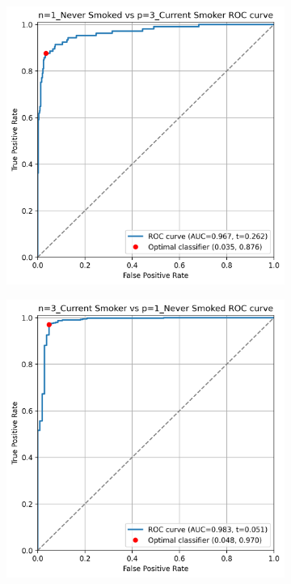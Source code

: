 \documentclass{article} %
\begin{document}
\begin{figure}[p]
    \centering
    \begin{subfigure}{0.46\linewidth}
        \centering
        \includegraphics[width=\linewidth]{cohort2/test_1v3_roc.png}
    \end{subfigure}
    \hspace{4mm}
    \begin{subfigure}{0.46\linewidth}
        \centering
        \includegraphics[width=\linewidth]{cohort2/test_3v1_roc.png}
    \end{subfigure}


\end{figure}
\end{document}
